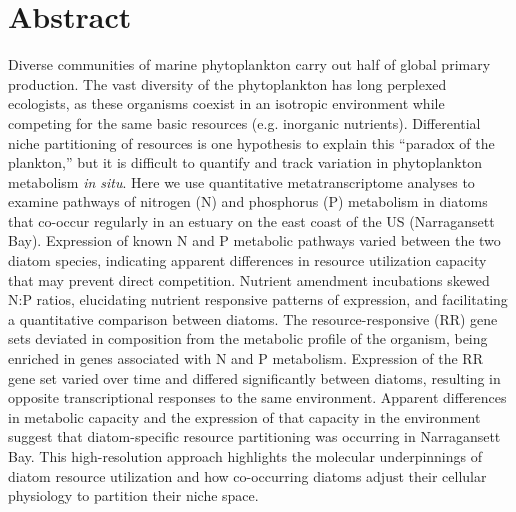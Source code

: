 \section{Abstract}
Diverse communities of marine phytoplankton carry out half of global primary production. The vast diversity of the phytoplankton has long perplexed ecologists, as these organisms coexist in an isotropic environment while competing for the same basic resources (e.g. inorganic nutrients). Differential niche partitioning of resources is one hypothesis to explain this ``paradox of the plankton,'' but it is difficult to quantify and track variation in phytoplankton metabolism \textit{in situ}. Here we use quantitative metatranscriptome analyses to examine pathways of nitrogen (N) and phosphorus (P) metabolism in diatoms that co-occur regularly in an estuary on the east coast of the US (Narragansett Bay). Expression of known N and P metabolic pathways varied between the two diatom species, indicating apparent differences in resource utilization capacity that may prevent direct competition.  Nutrient amendment incubations skewed N:P ratios, elucidating nutrient responsive patterns of expression, and facilitating a quantitative comparison between diatoms. The resource-responsive (RR) gene sets deviated in composition from the metabolic profile of the organism, being enriched in genes associated with N and P metabolism. Expression of the RR gene set varied over time and differed significantly between diatoms, resulting in opposite transcriptional responses to the same environment. Apparent differences in metabolic capacity and the expression of that capacity in the environment suggest that diatom-specific resource partitioning was occurring in Narragansett Bay. This high-resolution approach highlights the molecular underpinnings of diatom resource utilization and how co-occurring diatoms adjust their cellular physiology to partition their niche space. 
 
